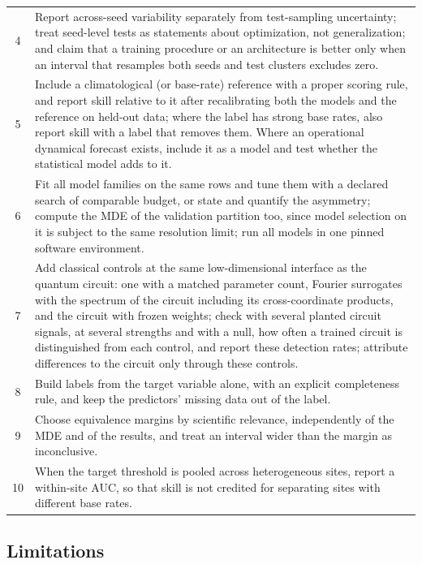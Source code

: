 \documentclass[11pt,a4paper]{article}
\begin{document}
\begin{table}[htbp]
{\begin{tabularx}{\textwidth}{cX}
4 & Report across-seed variability separately from test-sampling uncertainty; treat seed-level tests as statements about optimization, not generalization; and claim that a training procedure or an architecture is better only when an interval that resamples both seeds and test clusters excludes zero. \\
5 & Include a climatological (or base-rate) reference with a proper scoring rule, and report skill relative to it after recalibrating both the models and the reference on held-out data; where the label has strong base rates, also report skill with a label that removes them. Where an operational dynamical forecast exists, include it as a model and test whether the statistical model adds to it. \\
6 & Fit all model families on the same rows and tune them with a declared search of comparable budget, or state and quantify the asymmetry; compute the MDE of the validation partition too, since model selection on it is subject to the same resolution limit; run all models in one pinned software environment. \\
7 & Add classical controls at the same low-dimensional interface as the quantum circuit: one with a matched parameter count, Fourier surrogates with the spectrum of the circuit including its cross-coordinate products, and the circuit with frozen weights; check with several planted circuit signals, at several strengths and with a null, how often a trained circuit is distinguished from each control, and report these detection rates; attribute differences to the circuit only through these controls. \\
8 & Build labels from the target variable alone, with an explicit completeness rule, and keep the predictors' missing data out of the label. \\
9 & Choose equivalence margins by scientific relevance, independently of the MDE and of the results, and treat an interval wider than the margin as inconclusive. \\
10 & When the target threshold is pooled across heterogeneous sites, report a within-site AUC, so that skill is not credited for separating sites with different base rates. \\
\bottomrule
\end{tabularx}
}
\end{table}

\subsection{Limitations}
\label{sec:limitations}
\end{document}
